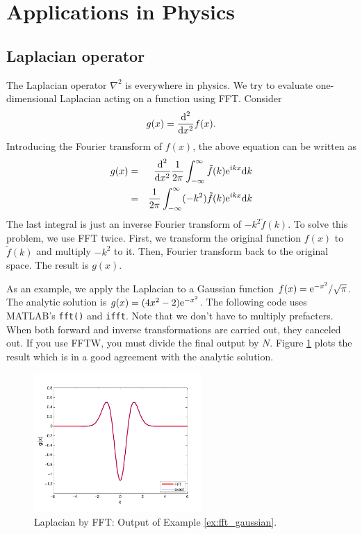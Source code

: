 \noindent
\section{Applications in Physics}

\subsection{Laplacian operator}\label{sec:fft_laplacian}

The Laplacian operator $\nabla^2$ is everywhere in physics.  We try to evaluate one-dimensional Laplacian acting on a function using FFT.
Consider
\begin{equation}
g(x) = \frac{\text{d}^2}{\text{d} x^2} f(x).
\end{equation}
Introducing the Fourier transform of $f(x)$, the above equation can be written as
\begin{eqnarray}
g(x) &=&  \frac{\text{d}^2}{\text{d} x^2} \frac{1}{2\pi} \int_{-\infty}^\infty \tilde{f}(k) \text{e}^{i k x} \text{d} k \nonumber \\
&=& \frac{1}{2\pi} \int_{-\infty}^\infty (-k^2) \tilde{f}(k) \text{e}^{i k x} \text{d} k \\
\end{eqnarray}
The last integral is just an inverse Fourier transform of $-k^2 \tilde{f}(k)$.  To solve this problem, we use FFT  twice.  First, we transform the original function $f(x)$ to $\tilde{f}(k)$ and multiply $-k^2$ to it.  Then, Fourier transform back to the original space.  The result is $g(x)$.  

As an example, we apply the Laplacian to a Gaussian function $f(x)=\text{e}^{-x^2}/\sqrt{\pi}$.  The analytic solution is $g(x) = (4x^2-2) \text{e}^{-x^2}$.  The following code uses MATLAB's \texttt{fft()} and \texttt{ifft}.  Note that we don't have to multiply prefacters.  When both forward and inverse transformations are carried out, they canceled out. If you use FFTW, you must divide the final output by $N$.  Figure \ref{fig:fft_laplacian} plots the result which is in a good agreement with the analytic solution.


\begin{figure}
\centering
\includegraphics[width=2.5in]{11.fft/fft_laplacian.pdf}
\caption{Laplacian by FFT: Output of Example \ref{ex:fft_gaussian}.}
\label{fig:fft_laplacian}
\end{figure}

